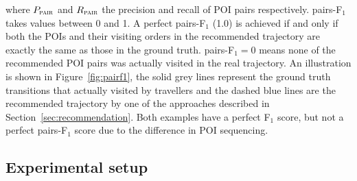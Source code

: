 where $P_{\textsc{pair}}$ and $R_{\textsc{pair}}$ the precision and recall of POI pairs respectively.
%
%
%
%
pairs-F$_1$ takes values between 0 and 1. A perfect pairs-F$_1$ (1.0) is achieved if and only if
both the POIs and their visiting orders in the
recommended trajectory are exactly the same as those in the ground truth.
pairs-F$_1 = 0$ means none of the recommended POI pairs was actually visited in the real trajectory.
An illustration is shown in Figure~\ref{fig:pairf1},
the solid grey lines represent the ground truth transitions that actually visited by travellers
and the dashed blue lines are the recommended trajectory by one of the approaches described in Section~\ref{sec:recommendation}.
Both examples have a perfect F$_1$ score, but not a perfect pairs-F$_1$ score due to the difference in POI sequencing.


\subsection{Experimental setup}
\label{sec:setup}
\secmoveup
%
%
%
%

%

